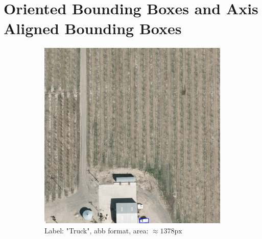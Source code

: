 \section{Oriented Bounding Boxes and Axis Aligned Bounding Boxes}
\begin{figure}[h]
    \centering
    
    \begin{subfigure}[b]{0.45\textwidth}
        \centering
        \includegraphics[trim={550pt 0pt 410pt 990pt},clip,width=\textwidth]{images/015Results/01abb_vs_obb/abb_truck.png}
        \caption{Label: "Truck", abb format, area: $\approx 1378 \text{px}$}
        \label{fig:abb_truck}
    \end{subfigure}
    \hfill
    \begin{subfigure}[b]{0.45\textwidth}
        \centering

\end{subfigure}
\end{figure}
